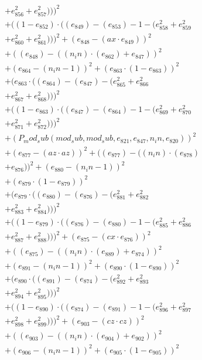 \documentclass[10pt, a4paper]{article}
\begin{document}
\begin{small}
\begin{align*}
& + e_{856}^{2} + e_{857}^{2})))^{2} \\
& + ((1 - e_{852})  \cdot  ((e_{849}) - (e_{853}) - 1 - (e_{858}^{2} + e_{859}^{2} \\
& + e_{860}^{2} + e_{861}^{2})))^{2} + (e_{848} - (ax  \cdot  e_{849}))^{2} \\
& + ((e_{848}) - ((n_in)  \cdot  (e_{862}) + e_{847}))^{2} \\
& + (e_{864} - (n_in - 1))^{2} + (e_{863}  \cdot  (1 - e_{863}))^{2} \\
& + (e_{863}  \cdot  ((e_{864}) - (e_{847}) - (e_{865}^{2} + e_{866}^{2} \\
& + e_{867}^{2} + e_{868}^{2})))^{2} \\
& + ((1 - e_{863})  \cdot  ((e_{847}) - (e_{864}) - 1 - (e_{869}^{2} + e_{870}^{2} \\
& + e_{871}^{2} + e_{872}^{2})))^{2} \\
& + (P_mod_sub(mod_sub, mod_sub, e_{821}, e_{847}, n_in, e_{820}))^{2} \\
& + (e_{877} - (az  \cdot  az))^{2} + ((e_{877}) - ((n_in)  \cdot  (e_{878}) \\
& + e_{876}))^{2} + (e_{880} - (n_in - 1))^{2} \\
& + (e_{879}  \cdot  (1 - e_{879}))^{2} \\
& + (e_{879}  \cdot  ((e_{880}) - (e_{876}) - (e_{881}^{2} + e_{882}^{2} \\
& + e_{883}^{2} + e_{884}^{2})))^{2} \\
& + ((1 - e_{879})  \cdot  ((e_{876}) - (e_{880}) - 1 - (e_{885}^{2} + e_{886}^{2} \\
& + e_{887}^{2} + e_{888}^{2})))^{2} + (e_{875} - (cx  \cdot  e_{876}))^{2} \\
& + ((e_{875}) - ((n_in)  \cdot  (e_{889}) + e_{874}))^{2} \\
& + (e_{891} - (n_in - 1))^{2} + (e_{890}  \cdot  (1 - e_{890}))^{2} \\
& + (e_{890}  \cdot  ((e_{891}) - (e_{874}) - (e_{892}^{2} + e_{893}^{2} \\
& + e_{894}^{2} + e_{895}^{2})))^{2} \\
& + ((1 - e_{890})  \cdot  ((e_{874}) - (e_{891}) - 1 - (e_{896}^{2} + e_{897}^{2} \\
& + e_{898}^{2} + e_{899}^{2})))^{2} + (e_{903} - (cz  \cdot  cz))^{2} \\
& + ((e_{903}) - ((n_in)  \cdot  (e_{904}) + e_{902}))^{2} \\
& + (e_{906} - (n_in - 1))^{2} + (e_{905}  \cdot  (1 - e_{905}))^{2} \\

\end{align*}
\end{small}
\end{document}
